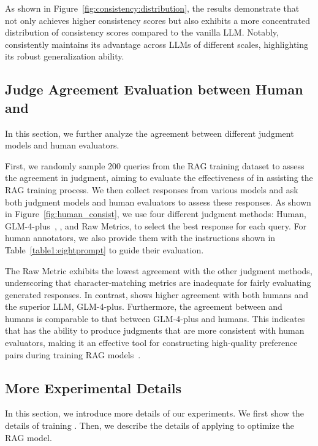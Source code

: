 As shown in Figure~\ref{fig:consistency:distribution}, the results demonstrate that \method{} not only achieves higher consistency scores but also exhibits a more concentrated distribution of consistency scores compared to the vanilla LLM. Notably, \method{} consistently maintains its advantage across LLMs of different scales, highlighting its robust generalization ability.


\subsection{Judge Agreement Evaluation between Human and \method{}}
In this section, we further analyze the agreement between different judgment models and human evaluators.

First, we randomly sample 200 queries from the RAG training dataset to assess the agreement in judgment, aiming to evaluate the effectiveness of \method{} in assisting the RAG training process. We then collect responses from various models and ask both judgment models and human evaluators to assess these responses. As shown in Figure~\ref{fig:human_consist}, we use four different judgment methods: Human, GLM-4-plus~\cite{du2022glm}, \method{}, and Raw Metrics, to select the best response for each query. For human annotators, we also provide them with the instructions shown in Table~\ref{table1:eightprompt} to guide their evaluation.

The Raw Metric exhibits the lowest agreement with the other judgment methods, underscoring that character-matching metrics are inadequate for fairly evaluating generated responses. In contrast, \method{} shows higher agreement with both humans and the superior LLM, GLM-4-plus. Furthermore, the agreement between \method{} and humans is comparable to that between GLM-4-plus and humans. This indicates that \method{} has the ability to produce judgments that are more consistent with human evaluators, making it an effective tool for constructing high-quality preference pairs during training RAG models~\cite{rag-ddr2024Li}.



\subsection{More Experimental Details}
\label{app:dataset details}
In this section, we introduce more details of our experiments. We first show the details of training \method{}. Then, we describe the details of applying \method{} to optimize the RAG model. 

